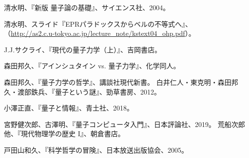 \documentclass[10pt,b5paper,papersize,dvipdfmx]{jsbook}
\begin{document}
\begin{thebibliography}{99}
  \item 清水明、『新版 量子論の基礎』、サイエンス社、2004。
  \item 清水明、スライド『EPRパラドックスからベルの不等式へ』、\\
  （\url{http://as2.c.u-tokyo.ac.jp/lecture_note/kstext04_ohp.pdf}）。
  \item J.J.サクライ、『現代の量子力学（上）』、吉岡書店。
  \item 森田邦久、『アインシュタイン vs. 量子力学』、化学同人。
  \item 森田邦久、『量子力学の哲学』、講談社現代新書。
   白井仁人・東克明・森田邦久・渡部鉄兵、『量子という謎』、勁草書房、2012。
  \item 小澤正直、『量子と情報』、青土社、2018。
  \item 宮野健次郎、古澤明、『量子コンピュータ入門』、日本評論社、2019。
   荒船次郎 他、『現代物理学の歴史 I』、朝倉書店。
  \item 戸田山和久、『科学哲学の冒険』、日本放送出版協会、2005。
\end{thebibliography}
\end{document}
